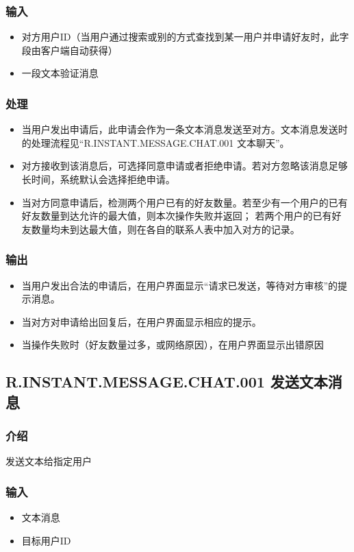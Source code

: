 \subsubsection{输入}
\begin{itemize}
	\item 对方用户ID（当用户通过搜索或别的方式查找到某一用户并申请好友时，此字段由客户端自动获得）
	\item 一段文本验证消息
\end{itemize}
\subsubsection{处理}
\begin{itemize}
	\item 当用户发出申请后，此申请会作为一条文本消息发送至对方。文本消息发送时的处理流程见“R.INSTANT.MESSAGE.CHAT.001 文本聊天”。
	\item 对方接收到该消息后，可选择同意申请或者拒绝申请。若对方忽略该消息足够长时间，系统默认会选择拒绝申请。
	\item 当对方同意申请后，检测两个用户已有的好友数量。若至少有一个用户的已有好友数量到达允许的最大值，则本次操作失败并返回；
	若两个用户的已有好友数量均未到达最大值，则在各自的联系人表中加入对方的记录。
\end{itemize}
\subsubsection{输出}
\begin{itemize}
	\item 当用户发出合法的申请后，在用户界面显示“请求已发送，等待对方审核”的提示消息。
	\item 当对方对申请给出回复后，在用户界面显示相应的提示。
	\item 当操作失败时（好友数量过多，或网络原因），在用户界面显示出错原因
\end{itemize}


\subsection{R.INSTANT.MESSAGE.CHAT.001 发送文本消息}
\subsubsection{介绍}

发送文本给指定用户

\subsubsection{输入}
\begin{itemize}
	\item 文本消息
	\item 目标用户ID
\end{itemize}

